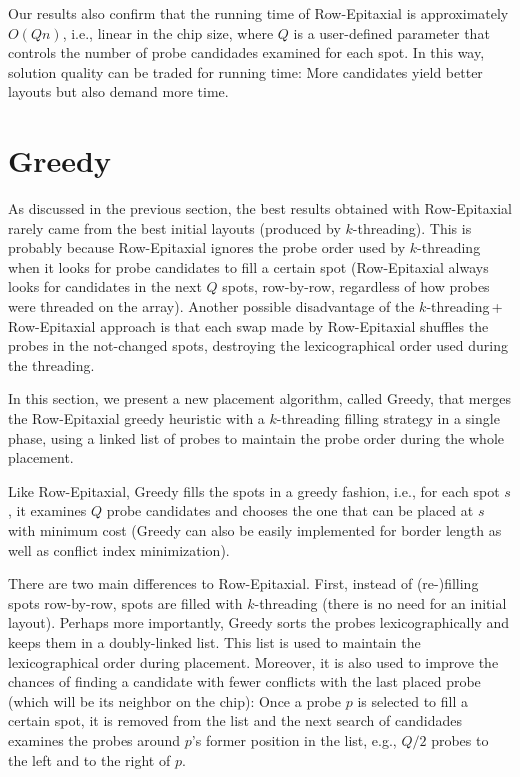 Our results also confirm that the running time of Row-Epitaxial is approximately
$O(Qn)$, i.e., linear in the chip size, where $Q$ is a user-defined parameter
that controls the number of probe candidades examined for each spot. In this
way, solution quality can be traded for running time: More candidates yield
better layouts but also demand more time.

\section{Greedy}
\label{sec:placement_greedy}

As discussed in the previous section, the best results obtained with
Row-Epitaxial rarely came from the best initial layouts (produced by
$k$-threading). This is probably because Row-Epitaxial ignores the probe order
used by $k$-threading when it looks for probe candidates to fill a certain spot
(Row-Epitaxial always looks for candidates in the next $Q$ spots, row-by-row,
regardless of how probes were threaded on the array). Another possible
disadvantage of the $k$-threading\,+\,Row-Epitaxial approach is that each swap
made by Row-Epitaxial shuffles the probes in the not-changed spots, destroying
the lexicographical order used during the threading.

In this section, we present a new placement algorithm, called Greedy, that
merges the Row-Epitaxial greedy heuristic with a $k$-threading filling strategy
in a single phase, using a linked list of probes to maintain the probe order
during the whole placement.

Like Row-Epitaxial, Greedy fills the spots in a greedy fashion, i.e., for each
spot $s$, it examines $Q$ probe candidates and chooses the one that can be
placed at $s$ with minimum cost (Greedy can also be easily implemented for
border length as well as conflict index minimization).

There are two main differences to Row-Epitaxial. First, instead of (re-)filling
spots row-by-row, spots are filled with $k$-threading (there is no need for an
initial layout). Perhaps more importantly, Greedy sorts the probes
lexicographically and keeps them in a doubly-linked list. This list is used to
maintain the lexicographical order during placement. Moreover, it is also used
to improve the chances of finding a candidate with fewer conflicts with the last
placed probe (which will be its neighbor on the chip): Once a probe $p$ is
selected to fill a certain spot, it is removed from the list and the next search
of candidades examines the probes around $p$'s former position in the list,
e.g., $Q/2$ probes to the left and to the right of $p$.

